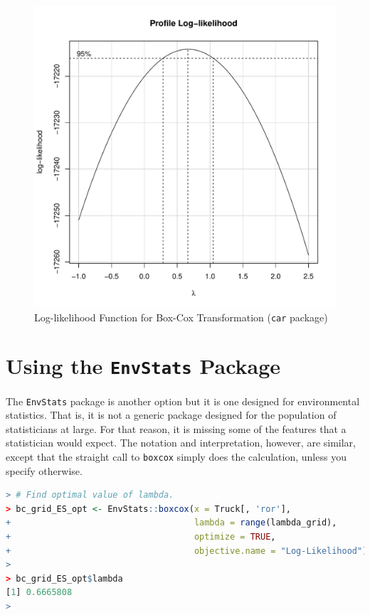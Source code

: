 \documentclass[11pt]{book}
\begin{document}
\begin{figure}[h!]
  \centering
  \includegraphics[scale = 0.5, keepaspectratio=true]{../Figures/plot_like_car}
  \caption{Log-likelihood Function for Box-Cox Transformation (\texttt{car} package)} \label{fig:plot_like_car}
\end{figure}


\clearpage
\section*{Using the \texttt{EnvStats} Package}


The \texttt{EnvStats} package is another option
but it is one designed for environmental statistics.
That is, it is not a generic package designed for the population of statisticians at large.
For that reason, it is missing some of the features that
a statistician would expect.
The notation and interpretation, however, are similar, 
except that the straight call to \texttt{boxcox}
simply does the calculation, 
unless you specify otherwise.

\begin{lstlisting}[language=R]
> # Find optimal value of lambda.
> bc_grid_ES_opt <- EnvStats::boxcox(x = Truck[, 'ror'],
+                                    lambda = range(lambda_grid),
+                                    optimize = TRUE,
+                                    objective.name = "Log-Likelihood")
> 
> bc_grid_ES_opt$lambda
[1] 0.6665808
> 
\end{lstlisting}
\end{document}
